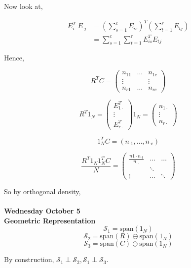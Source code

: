 \documentclass[11pt,fleqn]{book} %
\begin{document}
Now look at, 

		\begin{align*}
			E_{i \cdot}^T E_{\cdot j} &= \left( \sum^c_{s=1} E_{is} \right)^T \left(\sum^r_{t=1} E_{tj} \right)\\
				&= \sum^c_{s=1} \sum^r_{t=1} E^T_{is} E_{tj}
		\end{align*}



Hence, 

		$$R^TC = \begin{pmatrix}
			n_{11}&  \dots &  n_{1c}\\
			\vdots & & \vdots\\
			n_{r1}  & \dots & n_{rc}
		\end{pmatrix} $$
 
 		$$R^T 1_N = \begin{pmatrix}
 			E_{1 \cdot}^T\\
 			\vdots\\
 			E_{r\cdot}^T
 		\end{pmatrix} 1_N = \begin{pmatrix}
 			n_{1 \cdot}\\
 			\vdots\\
 			n_{r\cdot}
 		\end{pmatrix}$$

 		$$1^T_N C = (n_{\cdot 1}, \dots, n_{\cdot c}) $$


 		$$ \frac{R^T 1_N 1^T_N C }{N } = \begin{pmatrix}
 			\frac{n{1 \cdot} n_{\cdot 1}}{n_{\cdot \cdot}} & \dots & \dots \\
 			 & \ddots & \\
 			 \vdots & \dots & \ddots
 		\end{pmatrix}$$

So by orthogonal density, \\
\\

\textbf{Wednesday October 5}\\

\textbf{Geometric Representation}\\

		$$\mathcal{S}_1 = \text{span}(1_N) $$
		$$\mathcal{S}_2 = \text{span}(R) \ominus \text{span}(1_N) $$
		$$\mathcal{S}_3 = \text{span}(C) \ominus \text{span}(1_N) $$

By construction, $\mathcal{S}_1 \perp \mathcal{S}_2, \mathcal{S}_1 \perp \mathcal{S}_3$.\\
\end{document}
